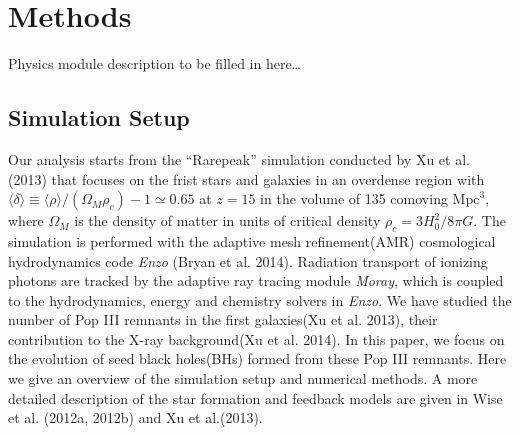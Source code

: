 \documentclass[useAMS,usenatbib]{mn2e}
\begin{document}
\section{Methods}
Physics module description to be filled in here\dots
\subsection{Simulation Setup}
Our analysis starts from the ``Rarepeak'' simulation conducted by Xu et al.
(2013) that focuses on the frist stars and galaxies in an overdense region with 
$\langle\delta\rangle \equiv \langle\rho\rangle/(\Omega_M\rho_c)-1\simeq 0.65$
at $z=15$ in the volume of 135 comoving $\mbox{Mpc}^3$, where $\Omega_M$ is the density
of matter in units of critical density $\rho_c = 3H^2_0/8\pi G$. The simulation
is performed with the adaptive mesh refinement(AMR) cosmological hydrodynamics
code \textit{Enzo} (Bryan et al. 2014). Radiation transport of ionizing photons are
tracked by the adaptive ray tracing module \textit{Moray}, which is coupled to the
hydrodynamics, energy and chemistry solvers in \textit{Enzo}. We have studied the
number of Pop III remnants in the first galaxies(Xu et al. 2013), their
contribution to the X-ray background(Xu et al. 2014). In this paper, we focus on
the evolution of seed black holes(BHs) formed from these Pop III remnants. 
Here we give an overview of the simulation setup and numerical methods. A more 
detailed description of the star formation and feedback models are given in 
Wise et al. (2012a, 2012b) and Xu et al.(2013).\\
\end{document}
